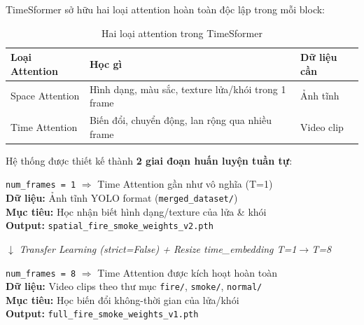 \documentclass[12pt,a4paper]{article}
\begin{document}
TimeSformer sở hữu hai loại attention hoàn toàn độc lập trong mỗi block:

\begin{table}[h!]
\centering
\begin{tabular}{lll}
\toprule
\textbf{Loại Attention} & \textbf{Học gì} & \textbf{Dữ liệu cần} \\
\midrule
Space Attention & Hình dạng, màu sắc, texture lửa/khói trong 1 frame & Ảnh tĩnh \\
Time Attention  & Biến đổi, chuyển động, lan rộng qua nhiều frame    & Video clip \\
\bottomrule
\end{tabular}
\caption{Hai loại attention trong TimeSformer}
\end{table}

Hệ thống được thiết kế thành \textbf{2 giai đoạn huấn luyện tuần tự}:

\begin{tcolorbox}[
  colback=spatialBlue!5, colframe=spatialBlue!50,
  arc=5pt, boxrule=0.8pt, title={\textbf{Giai đoạn 1 --- Spatial Pre-training}},
  fonttitle=\bfseries\color{spatialBlue}
]
\texttt{num\_frames = 1} $\Rightarrow$ Time Attention gần như vô nghĩa (T=1)\\
\textbf{Dữ liệu:} Ảnh tĩnh YOLO format (\texttt{merged\_dataset/})\\
\textbf{Mục tiêu:} Học nhận biết hình dạng/texture của lửa \& khói\\
\textbf{Output:} \texttt{spatial\_fire\_smoke\_weights\_v2.pth}
\end{tcolorbox}

\vspace{0.3cm}
\begin{center}
  $\downarrow$ \textit{Transfer Learning (strict=False) + Resize time\_embedding T=1$\to$T=8}
\end{center}
\vspace{0.3cm}

\begin{tcolorbox}[
  colback=temporalGreen!5, colframe=temporalGreen!50,
  arc=5pt, boxrule=0.8pt, title={\textbf{Giai đoạn 2 --- Full Spatio-Temporal Training}},
  fonttitle=\bfseries\color{temporalGreen}
]
\texttt{num\_frames = 8} $\Rightarrow$ Time Attention được kích hoạt hoàn toàn\\
\textbf{Dữ liệu:} Video clips theo thư mục \texttt{fire/}, \texttt{smoke/}, \texttt{normal/}\\
\textbf{Mục tiêu:} Học biến đổi không-thời gian của lửa/khói\\
\textbf{Output:} \texttt{full\_fire\_smoke\_weights\_v1.pth}
\end{tcolorbox}
\end{document}
